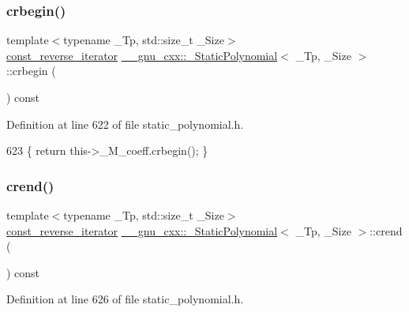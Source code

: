 \subsubsection{\texorpdfstring{crbegin()}{crbegin()}}
{\footnotesize\ttfamily template$<$typename \+\_\+\+Tp, std\+::size\+\_\+t \+\_\+\+Size$>$ \\
\hyperlink{class____gnu__cxx_1_1__StaticPolynomial_ae59b7bc5bdf7c61e562e8c4c8eaf904d}{const\+\_\+reverse\+\_\+iterator} \hyperlink{class____gnu__cxx_1_1__StaticPolynomial}{\+\_\+\+\_\+gnu\+\_\+cxx\+::\+\_\+\+Static\+Polynomial}$<$ \+\_\+\+Tp, \+\_\+\+Size $>$\+::crbegin (\begin{DoxyParamCaption}{ }\end{DoxyParamCaption}) const\hspace{0.3cm}{\ttfamily [inline]}}



Definition at line 622 of file static\+\_\+polynomial.\+h.


\begin{DoxyCode}
623       \{ \textcolor{keywordflow}{return} this->\_M\_coeff.crbegin(); \}
\end{DoxyCode}
\mbox{\label{class____gnu__cxx_1_1__StaticPolynomial_acb1591941949826c5cf6633b8df8ef55}} 
\subsubsection{\texorpdfstring{crend()}{crend()}}
{\footnotesize\ttfamily template$<$typename \+\_\+\+Tp, std\+::size\+\_\+t \+\_\+\+Size$>$ \\
\hyperlink{class____gnu__cxx_1_1__StaticPolynomial_ae59b7bc5bdf7c61e562e8c4c8eaf904d}{const\+\_\+reverse\+\_\+iterator} \hyperlink{class____gnu__cxx_1_1__StaticPolynomial}{\+\_\+\+\_\+gnu\+\_\+cxx\+::\+\_\+\+Static\+Polynomial}$<$ \+\_\+\+Tp, \+\_\+\+Size $>$\+::crend (\begin{DoxyParamCaption}{ }\end{DoxyParamCaption}) const\hspace{0.3cm}{\ttfamily [inline]}}



Definition at line 626 of file static\+\_\+polynomial.\+h.


